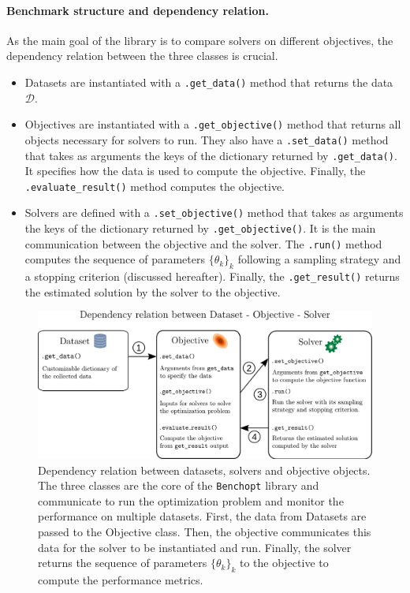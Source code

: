 \paragraph*{Benchmark structure and dependency relation.}

As the main goal of the library is to compare solvers on different objectives, the dependency relation between the three classes is crucial.
\begin{itemize}
    \item Datasets are instantiated with a \texttt{.get\_data()} method that returns the data $\mathcal{D}$.
    \item Objectives are instantiated with a \texttt{.get\_objective()} method that returns all objects necessary for solvers to run.
    They also have a \texttt{.set\_data()} method that takes as arguments the keys of the dictionary returned by \texttt{.get\_data()}. It specifies how the data is used to compute the objective. Finally, the \texttt{.evaluate\_result()} method computes the objective.
    \item Solvers are defined with a \texttt{.set\_objective()} method that takes as arguments the keys of the dictionary returned by \texttt{.get\_objective()}. It is the main communication between the objective and the solver. The \texttt{.run()} method computes the sequence of parameters $\{\theta_k\}_k$ following a sampling strategy and a stopping criterion (discussed hereafter). Finally, the \texttt{.get\_result()} returns the estimated solution by the solver to the objective.
\end{itemize}

\begin{figure}[htb]
    \centering
    \includegraphics[width=.8\textwidth, clip, trim={0cm 0cm 0cm 1.5cm}]{./images_benchopt/benchopt_schema_dependency.pdf}
    \caption{Dependency relation between datasets, solvers and objective objects. The three classes are the core of the \texttt{Benchopt} library and communicate to run the optimization problem and monitor the performance on multiple datasets. First, the data from Datasets are passed to the Objective class. Then, the objective communicates this data for the solver to be instantiated and run. Finally, the solver returns the sequence of parameters $\{\theta_k\}_k$ to the objective to compute the performance metrics.}
    \label{fig:benchopt-dep}
\end{figure}

